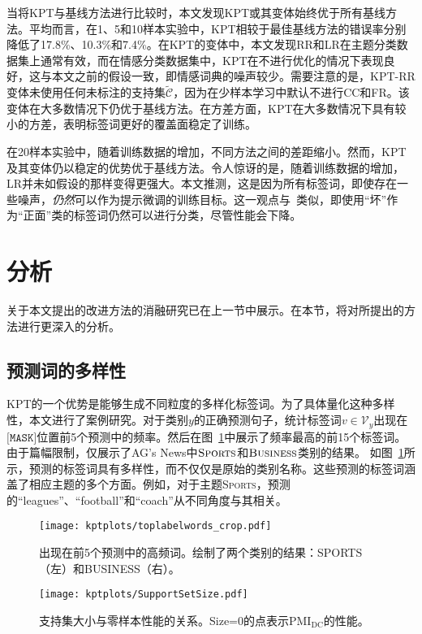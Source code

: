 当将KPT与基线方法进行比较时，本文发现KPT或其变体始终优于所有基线方法。平均而言，在1、5和10样本实验中，KPT相较于最佳基线方法的错误率分别降低了17.8\%、10.3\%和7.4\%。在KPT的变体中，本文发现RR和LR在主题分类数据集上通常有效，而在情感分类数据集中，KPT在不进行优化的情况下表现良好，这与本文之前的假设一致，即情感词典的噪声较少。需要注意的是，KPT-RR变体未使用任何未标注的支持集$\tilde{\mathcal{C}}$，因为在少样本学习中默认不进行CC和FR。该变体在大多数情况下仍优于基线方法。在方差方面，KPT在大多数情况下具有较小的方差，表明标签词更好的覆盖面稳定了训练。

在20样本实验中，随着训练数据的增加，不同方法之间的差距缩小。然而，KPT及其变体仍以稳定的优势优于基线方法。令人惊讶的是，随着训练数据的增加，LR并未如假设的那样变得更强大。本文推测，这是因为所有标签词，即使存在一些噪声，\emph{仍然}可以作为提示微调的训练目标。这一观点与~\citet{gao2020making}类似，即使用“坏”作为“正面”类的标签词仍然可以进行分类，尽管性能会下降。


\section{分析}
\label{sec:analysis}
关于本文提出的改进方法的消融研究已在上一节中展示。在本节，将对所提出的方法进行更深入的分析。


\subsection{预测词的多样性}

KPT的一个优势是能够生成不同粒度的多样化标签词。为了具体量化这种多样性，本文进行了案例研究。对于类别$y$的正确预测句子，统计标签词$v\in \mathcal{V}_y$出现在$\texttt{[MASK]}$位置前5个预测中的频率。然后在图~\ref{fig:violin}中展示了频率最高的前15个标签词。由于篇幅限制，仅展示了AG's News中$\textsc{Sports}$和$\textsc{Business}$类别的结果。
如图~\ref{fig:violin}所示，预测的标签词具有多样性，而不仅仅是原始的类别名称。这些预测的标签词涵盖了相应主题的多个方面。例如，对于主题\textsc{Sports}，预测的“leagues”、“football”和“coach”从不同角度与其相关。

\begin{figure}[H]
    \centering
    \texttt{[image: kptplots/toplabelwords\_crop.pdf]}
    \caption{出现在前5个预测中的高频词。绘制了两个类别的结果：\textsc{SPORTS}（左）和\textsc{BUSINESS}（右）。}
    \label{fig:violin}
\end{figure}


\label{app:analysis}
\begin{figure}
    \centering
    \texttt{[image: kptplots/SupportSetSize.pdf]}
    \caption{支持集大小与零样本性能的关系。Size=0的点表示$\text{PMI}_\text{DC}$的性能。}
    \label{fig:calistudy}
\end{figure}

